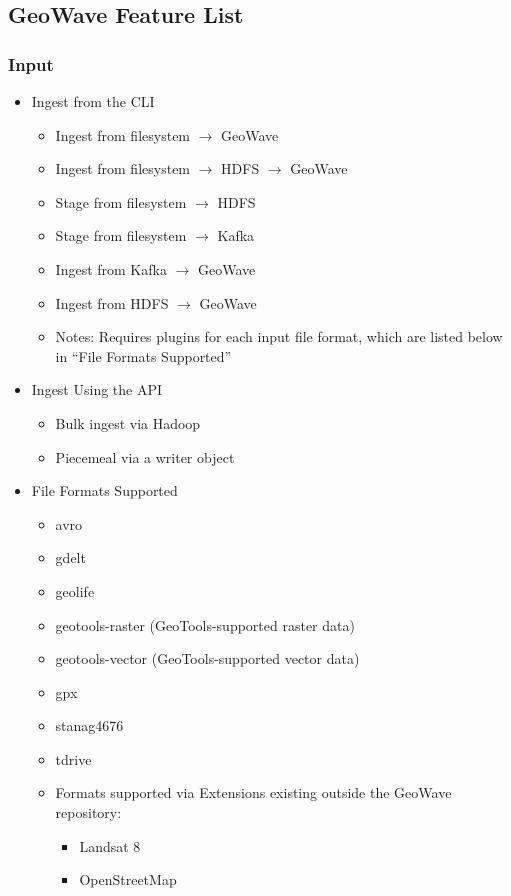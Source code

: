 \subsection{GeoWave Feature List}
\label{appendix:features:geowave}

\subsubsection*{Input}

\begin{itemize}
\item{
  Ingest from the CLI
  \begin{itemize}
  \item Ingest from filesystem $\rightarrow$ GeoWave
  \item Ingest from filesystem $\rightarrow$ HDFS $\rightarrow$ GeoWave
  \item Stage from filesystem $\rightarrow$ HDFS
  \item Stage from filesystem $\rightarrow$ Kafka
  \item Ingest from Kafka $\rightarrow$ GeoWave
  \item Ingest from HDFS $\rightarrow$ GeoWave
  \item Notes: Requires plugins for each input file format, which are listed below in ``File Formats Supported''
  \end{itemize}
}
\item{
  Ingest Using the API
  \begin{itemize}
  \item Bulk ingest via Hadoop
  \item Piecemeal via a writer object
  \end{itemize}
}
\item{
  File Formats Supported
  \begin{itemize}
  \item avro
  \item gdelt
  \item geolife
  \item geotools-raster (GeoTools-supported raster data)
  \item geotools-vector (GeoTools-supported vector data)
  \item gpx
  \item stanag4676
  \item tdrive
  \item{
    Formats supported via Extensions existing outside the GeoWave repository:
    \begin{itemize}
    \item Landsat 8
    \item OpenStreetMap
    \end{itemize}
  }
  \end{itemize}
}
\end{itemize}


